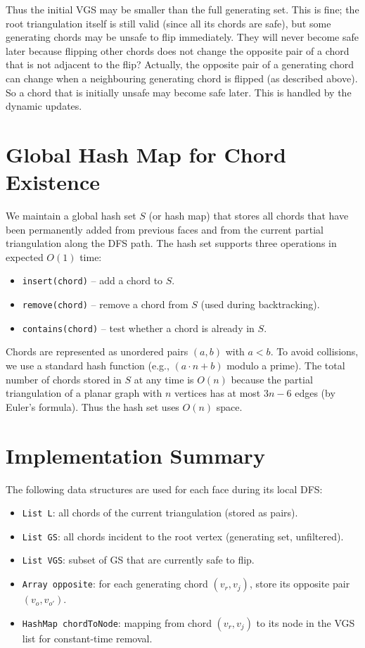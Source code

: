 Thus the initial VGS may be smaller than the full generating set. 
This is fine; the root triangulation itself is still valid (since all its chords are safe), but some generating chords may be unsafe to flip immediately. 
They will never become safe later because flipping other chords does not change the opposite pair of a chord that is not adjacent to the flip? 
Actually, the opposite pair of a generating chord can change when a neighbouring generating chord is flipped (as described above). 
So a chord that is initially unsafe may become safe later. 
This is handled by the dynamic updates.

\section{Global Hash Map for Chord Existence}
\label{sec:vgs_hashmap}

We maintain a global hash set \(S\) (or hash map) that stores all chords that have been permanently added from previous faces and from the current partial triangulation along the DFS path. 
The hash set supports three operations in expected \(O(1)\) time:
\begin{itemize}
    \item \texttt{insert(chord)} – add a chord to \(S\).
    \item \texttt{remove(chord)} – remove a chord from \(S\) (used during backtracking).
    \item \texttt{contains(chord)} – test whether a chord is already in \(S\).
\end{itemize}

Chords are represented as unordered pairs \((a, b)\) with \(a < b\). 
To avoid collisions, we use a standard hash function (e.g., \((a \cdot n + b)\) modulo a prime). 
The total number of chords stored in \(S\) at any time is \(O(n)\) because the partial triangulation of a planar graph with \(n\) vertices has at most \(3n-6\) edges (by Euler’s formula). 
Thus the hash set uses \(O(n)\) space.

\section{Implementation Summary}
\label{sec:vgs_implementation_summary}

The following data structures are used for each face during its local DFS:
\begin{itemize}
    \item \texttt{List L}: all chords of the current triangulation (stored as pairs).
    \item \texttt{List GS}: all chords incident to the root vertex (generating set, unfiltered).
    \item \texttt{List VGS}: subset of GS that are currently safe to flip.
    \item \texttt{Array opposite}: for each generating chord \((v_r, v_j)\), store its opposite pair \((v_o, v_{o'})\).
    \item \texttt{HashMap chordToNode}: mapping from chord \((v_r, v_j)\) to its node in the VGS list for constant-time removal.
\end{itemize}

